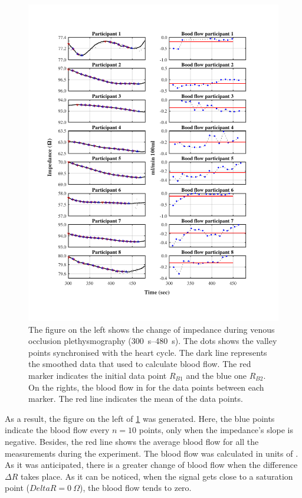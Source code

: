 \begin{figure}[!htpb]
	\includegraphics[width=\textwidth,height=\textheight,keepaspectratio,trim={0.5cm 0cm 0cm 1cm},clip]{figure_vop_10}    
	\caption[Blood flow calculated from venous occlusion plethysmography for every 10 beats of data points]{The figure on the left shows the change of impedance during venous occlusion plethysmography (\SIrange{300}{480}{\second}). The dots shows the valley points synchronised with the heart cycle. The dark line represents the smoothed data that used to calculate blood flow. The red marker indicates the initial data point $R_{B1}$ and the blue one $R_{B2}$. On the rights, the blood flow in \si{\bfv} for the data points between each marker. The red line indicates the mean of the data points.}
	\label{fig:blood_flow:venous_occlusion}
\end{figure}

As a result, the figure on the left of \ref{fig:blood_flow:venous_occlusion} was generated. Here, the blue points indicate the blood flow every $n=10$ points, only when the impedance's slope is negative. Besides, the red line shows the average blood flow for all the measurements during the experiment. The blood flow was calculated in units of \si{\bfv}. As it was anticipated, there is a greater change of blood flow when the difference $\Delta R$ takes place. As it can be noticed, when the signal gets close to a saturation point ($Delta R = \SI{0}{\Omega}$), the blood flow tends to zero. 

